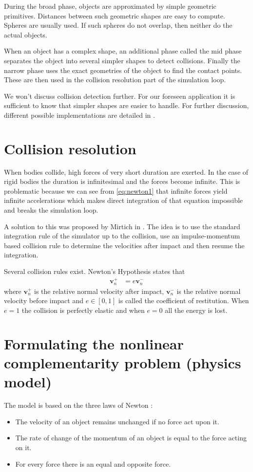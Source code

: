 During the broad phase, objects are approximated by simple geometric primitives. Distances between such geometric shapes are easy to compute. Spheres are usually used. If such spheres do not overlap, then neither do the actual objects.

When an object has a complex shape, an additional phase called the mid phase separates the object into several simpler shapes to detect collisions. Finally the narrow phase uses the exact geometries of the object to find the contact points. These are then used in the collision resolution part of the simulation loop.

We won't discuss collision detection further. For our foreseen application it is sufficient to know that simpler shapes are easier to handle. For further discussion, different possible implementations are detailed in \cite{jimenez20013d}.

\section{Collision resolution}
When bodies collide, high forces of very short duration are exerted. In the case of rigid bodies the duration is infinitesimal and the forces become infinite. This is problematic because we can see from \cref{eq:newton1} that infinite forces yield infinite accelerations which makes direct integration of that equation impossible and breaks the simulation loop.

A solution to this was proposed by Mirtich in \cite{mirtich1996impulse}. The idea is to use the standard integration rule of the simulator up to the collision, use an impulse-momentum based collision rule to determine the velocities after impact and then resume the integration.

Several collision rules exist. Newton's Hypothesis states that 
\begin{align*}
\mathbf{v}_n^+ &= e\mathbf{v}_n^-
\end{align*}
where $\mathbf{v}_n^+$ is the relative normal velocity after impact, $\mathbf{v}_n^-$ is the relative normal velocity before impact and $e \in [0, 1]$ is called the coefficient of restitution. When $e=1$ the collision is perfectly elastic and when $e=0$ all the energy is lost.

\section{Formulating the nonlinear complementarity problem (physics model)}
The model is based on the three laws of Newton :\begin{itemize}
\item The velocity of an object remains unchanged if no force act upon it.
\item The rate of change of the momentum of an object is equal to the force acting on it.
\item For every force there is an equal and opposite force.
\end{itemize}

